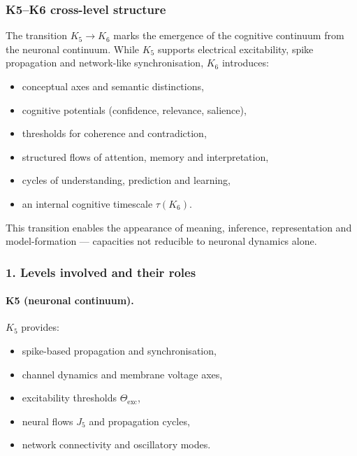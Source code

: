 
\subsubsection{K5–K6 cross-level structure}
\label{sec:crossk-k5-k6}

The transition $K_5 \rightarrow K_6$ marks the emergence of the cognitive
continuum from the neuronal continuum. While $K_5$ supports electrical
excitability, spike propagation and network-like synchronisation, $K_6$
introduces:
\begin{itemize}
  \item conceptual axes and semantic distinctions,
  \item cognitive potentials (confidence, relevance, salience),
  \item thresholds for coherence and contradiction,
  \item structured flows of attention, memory and interpretation,
  \item cycles of understanding, prediction and learning,
  \item an internal cognitive timescale $\tau(K_6)$.
\end{itemize}

This transition enables the appearance of meaning, inference,
representation and model-formation — capacities not reducible to neuronal
dynamics alone.

\subsubsection{1. Levels involved and their roles}

\paragraph{K5 (neuronal continuum).}
$K_5$ provides:
\begin{itemize}
  \item spike-based propagation and synchronisation,
  \item channel dynamics and membrane voltage axes,
  \item excitability thresholds $\Theta_{\mathrm{exc}}$,
  \item neural flows $J_5$ and propagation cycles,
  \item network connectivity and oscillatory modes.
\end{itemize}

